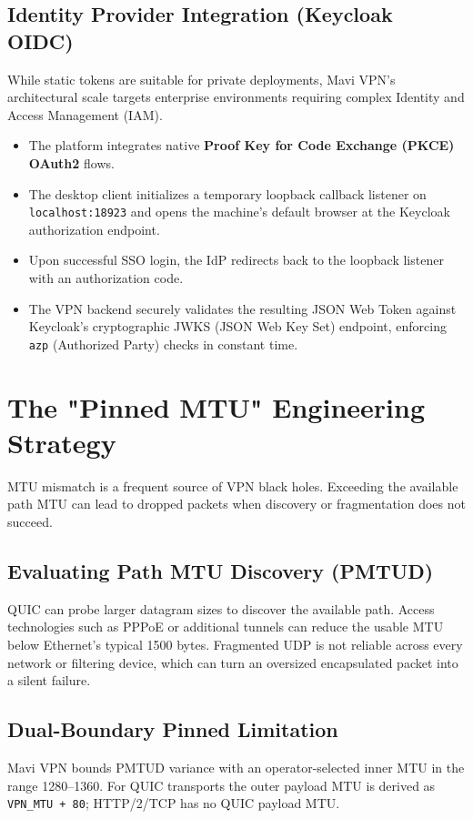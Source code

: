 \documentclass[11pt,a4paper]{article}
\begin{document}
\subsection{Identity Provider Integration (Keycloak OIDC)}
While static tokens are suitable for private deployments, Mavi VPN's architectural scale targets enterprise environments requiring complex Identity and Access Management (IAM).
\begin{itemize}
    \item The platform integrates native \textbf{Proof Key for Code Exchange (PKCE) OAuth2} flows.
    \item The desktop client initializes a temporary loopback callback listener on \texttt{localhost:18923} and opens the machine's default browser at the Keycloak authorization endpoint.
    \item Upon successful SSO login, the IdP redirects back to the loopback listener with an authorization code.
    \item The VPN backend securely validates the resulting JSON Web Token against Keycloak's cryptographic JWKS (JSON Web Key Set) endpoint, enforcing \texttt{azp} (Authorized Party) checks in constant time. 
\end{itemize}

\section{The "Pinned MTU" Engineering Strategy}

MTU mismatch is a frequent source of VPN black holes. Exceeding the available path MTU can lead to dropped packets when discovery or fragmentation does not succeed.

\subsection{Evaluating Path MTU Discovery (PMTUD)}
QUIC can probe larger datagram sizes to discover the available path. Access technologies such as PPPoE or additional tunnels can reduce the usable MTU below Ethernet's typical 1500 bytes.
Fragmented UDP is not reliable across every network or filtering device, which can turn an oversized encapsulated packet into a silent failure.

\subsection{Dual-Boundary Pinned Limitation}
Mavi VPN bounds PMTUD variance with an operator-selected inner MTU in the
range 1280--1360. For QUIC transports the outer payload MTU is derived as
\texttt{VPN\_MTU + 80}; HTTP/2/TCP has no QUIC payload MTU.
\end{document}
